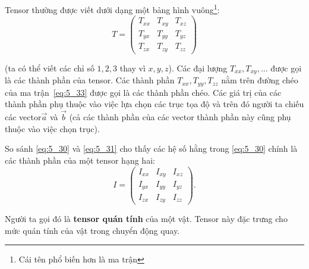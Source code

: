 Tensor thường được viết dưới dạng một bảng hình vuông\footnote{Cái tên phổ biến hơn là ma trận}:
\begin{equation}\label{eq:5_33}
	T = \begin{pmatrix}
		T_{xx}&T_{xy}&T_{xz}\\
		T_{yx}&T_{yy}&T_{yz}\\
		T_{zx}&T_{zy}&T_{zz}
		\end{pmatrix}
\end{equation}

\noindent
(ta có thể viết các chỉ số $1, 2, 3$ thay vì $x, y, z$).  Các đại lượng $T_{xx}, T_{xy}, \ldots$ được gọi là các thành phần của tensor. Các thành phần $T_{xx}, T_{yy}, T_{zz}$ nằm trên đường chéo của ma trận~\eqref{eq:5_33} được gọi là các thành phần chéo. Các giá trị của các thành phần phụ thuộc vào việc lựa chọn các trục tọa độ và trên đó người ta chiếu các vector$\vec{a}$ và $\vec{b}$ (cả các thành phần của các vector thành phần này cũng phụ thuộc vào việc chọn trục).

So sánh \eqref{eq:5_30} và \eqref{eq:5_31} cho thấy các hệ số hằng trong \eqref{eq:5_30} chính là các thành phần của một tensor hạng hai:
\begin{equation}\label{eq:5_34}
	I = \begin{pmatrix}
		I_{xx}&I_{xy}&I_{xz}\\
		I_{yx}&I_{yy}&I_{yz}\\
		I_{zx}&I_{zy}&I_{zz}
	\end{pmatrix}.
\end{equation}

\noindent
Người ta gọi đó là \textbf{tensor quán tính} của một vật. Tensor này đặc trưng cho mức quán tính của vật trong chuyển động quay.

